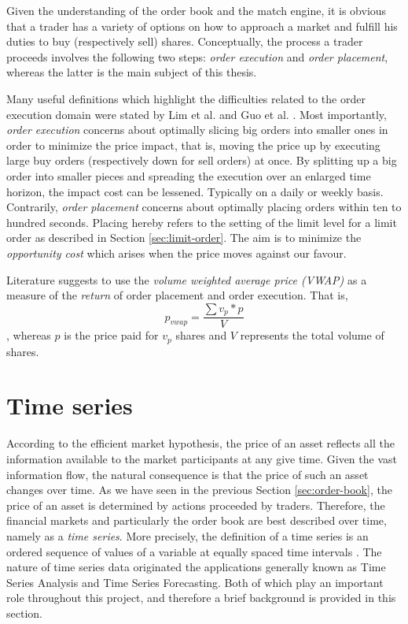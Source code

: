 Given the understanding of the order book and the match engine, it is obvious that a trader has a variety of options on how to approach a market and fulfill his duties to buy (respectively sell) shares.
Conceptually, the process a trader proceeds involves the following two steps: \textit{order execution} and \textit{order placement}, whereas the latter is the main subject of this thesis.

Many useful definitions which highlight the difficulties related to the order execution domain were stated by Lim et al. \cite{lim2005optimal} and Guo et al. \cite{guo2013optimal}.
Most importantly, \textit{order execution} concerns about optimally slicing big orders into smaller ones in order to minimize the price impact, that is, moving the price up by executing large buy orders (respectively down for sell orders) at once. 
By splitting up a big order into smaller pieces and spreading the execution over an enlarged time horizon, the impact cost can be lessened.
Typically on a daily or weekly basis.
Contrarily, \textit{order placement} concerns about optimally placing orders within ten to hundred seconds.
Placing hereby refers to the setting of the limit level for a limit order as described in Section \ref{sec:limit-order}.
The aim is to minimize the \textit{opportunity cost} which arises when the price moves against our favour.

Literature\cite{nevmyvaka2006reinforcement, guo2013optimal} suggests to use the \textit{volume weighted average price (VWAP)} as a measure of the \textit{return} of order placement and order execution.
That is,
\begin{equation}\label{eq:vwap}
    p_{vwap}=\frac{\sum{v_p*p}}{V}
\end{equation}
, whereas $p$ is the price paid for $v_p$ shares and $V$ represents the total volume of shares.

\section{Time series}

According to the efficient market hypothesis\cite{malkiel1989efficient}, the price of an asset reflects all the information available to the market participants at any give time. 
Given the vast information flow, the natural consequence is that the price of such an asset changes over time.
As we have seen in the previous Section \ref{sec:order-book}, the price of an asset is determined by actions proceeded by traders.
Therefore, the financial markets and particularly the order book are best described over time, namely as a \textit{time series}. 
More precisely, the definition of a time series is an ordered sequence of values of a variable at equally spaced time intervals \cite{intro-timeseries}.
The nature of time series data originated the applications generally known as Time Series Analysis and Time Series Forecasting.
Both of which play an important role throughout this project, and therefore a brief background is provided in this section.

